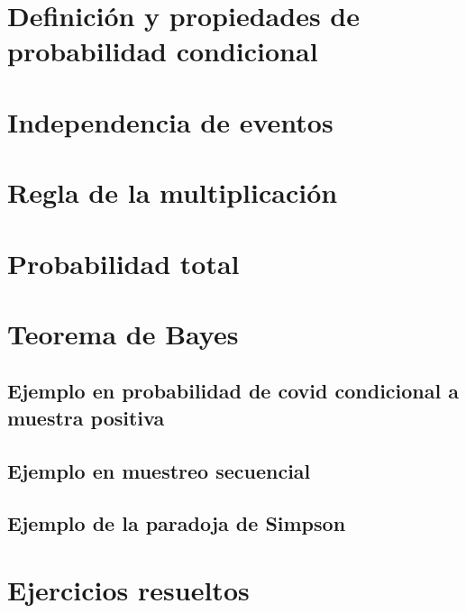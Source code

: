 \documentclass[
]{book}
\begin{document}
\hypertarget{definiciuxf3n-y-propiedades-de-probabilidad-condicional}{%
\section{Definición y propiedades de probabilidad condicional}\label{definiciuxf3n-y-propiedades-de-probabilidad-condicional}}

\hypertarget{independencia-de-eventos}{%
\section{Independencia de eventos}\label{independencia-de-eventos}}

\hypertarget{regla-de-la-multiplicaciuxf3n}{%
\section{Regla de la multiplicación}\label{regla-de-la-multiplicaciuxf3n}}

\hypertarget{probabilidad-total}{%
\section{Probabilidad total}\label{probabilidad-total}}

\hypertarget{teorema-de-bayes}{%
\section{Teorema de Bayes}\label{teorema-de-bayes}}

\hypertarget{ejemplo-en-probabilidad-de-covid-condicional-a-muestra-positiva}{%
\subsection{Ejemplo en probabilidad de covid condicional a muestra positiva}\label{ejemplo-en-probabilidad-de-covid-condicional-a-muestra-positiva}}

\hypertarget{ejemplo-en-muestreo-secuencial}{%
\subsection{Ejemplo en muestreo secuencial}\label{ejemplo-en-muestreo-secuencial}}

\hypertarget{ejemplo-de-la-paradoja-de-simpson}{%
\subsection{Ejemplo de la paradoja de Simpson}\label{ejemplo-de-la-paradoja-de-simpson}}

\hypertarget{ejercicios-resueltos-2}{%
\section{Ejercicios resueltos}\label{ejercicios-resueltos-2}}

  
\end{document}
